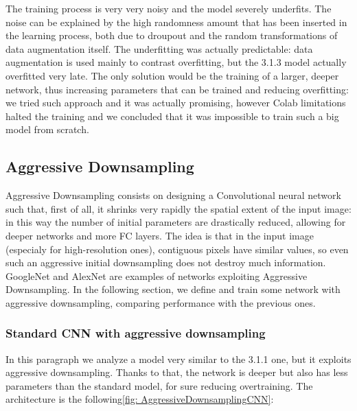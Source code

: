 \medskip

\noindent The training process is very very noisy and the model severely underfits. The noise can be explained by the high randomness amount that has been inserted in the learning process, both due to droupout and the random transformations of data augmentation itself.
The underfitting was actually predictable: data augmentation is used mainly to contrast overfitting, but the 3.1.3 model actually overfitted very late.
The only solution would be the training of a larger, deeper network, thus increasing parameters that can be trained and reducing overfitting: we tried such approach and it was actually promising, however Colab limitations halted the training and we concluded that it was impossible to train such a big model from scratch.


\subsection{Aggressive Downsampling}
Aggressive Downsampling consists on designing a Convolutional neural network such that, first of all, it shrinks very rapidly the spatial extent of the input image: in this way the number of initial parameters are drastically reduced, allowing for deeper networks and more FC layers. The idea is that in the input image (especialy for high-resolution ones), contiguous pixels have similar values, so even such an aggressive initial downsampling does not destroy much information. GoogleNet and AlexNet are examples of networks exploiting Aggressive Downsampling. In the following section, we define and train some network with aggressive downsampling, comparing performance with the previous ones.

\subsubsection{Standard CNN with aggressive downsampling}
In this paragraph we analyze a model very similar to the 3.1.1 one, but it exploits aggressive downsampling. Thanks to that, the network is deeper but also has less parameters than the standard model, for sure reducing overtraining.
The architecture is the following\ref{fig: AggressiveDownsamplingCNN}:

